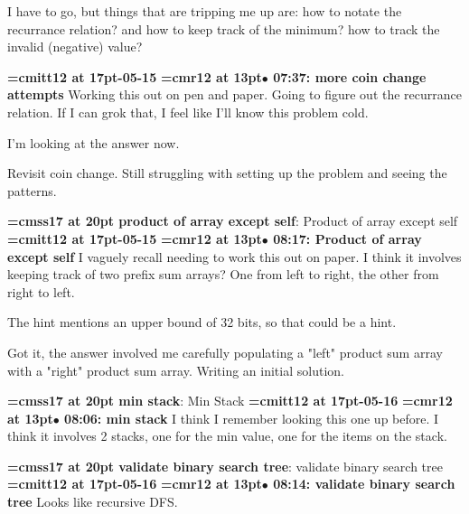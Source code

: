 I have to go, but things that are tripping me up are: how to notate the recurrance relation? and how to keep track of the minimum? how to track the invalid (negative) value?
\par

{\medskip\noindent\bf\font\titlefont=cmitt12 at 17pt-05-15}\medskip
{\smallskip\noindent\bf\font\titlefont=cmr12 at 13pt\titlefont $\bullet$ 07:37: more coin change attempts}\smallskip
Working this out on pen and paper. Going to figure out the recurrance relation. If I can grok that, I feel like I'll know this problem cold.
\par

I'm looking at the answer now.
\par

Revisit coin change. Still struggling with setting up the problem and seeing the patterns.
\par

{\medskip\noindent\bf\font\titlefont=cmss17 at 20pt product of array except self}: Product of array except self
{\medskip\noindent\bf\font\titlefont=cmitt12 at 17pt-05-15}\medskip
{\smallskip\noindent\bf\font\titlefont=cmr12 at 13pt\titlefont $\bullet$ 08:17: Product of array except self}\smallskip
I vaguely recall needing to work this out on paper. I think it involves keeping track of two prefix sum arrays? One from left to right, the other from right to left.
\par

The hint mentions an upper bound of 32 bits, so that could be a hint.
\par

Got it, the answer involved me carefully populating a "left" product sum array with a "right" product sum array. Writing an initial solution.
\par

{\medskip\noindent\bf\font\titlefont=cmss17 at 20pt min stack}: Min Stack
{\medskip\noindent\bf\font\titlefont=cmitt12 at 17pt-05-16}\medskip
{\smallskip\noindent\bf\font\titlefont=cmr12 at 13pt\titlefont $\bullet$ 08:06: min stack}\smallskip
I think I remember looking this one up before. I think it involves 2 stacks, one for the min value, one for the items on the stack.
\par

{\medskip\noindent\bf\font\titlefont=cmss17 at 20pt validate binary search tree}: validate binary search tree
{\medskip\noindent\bf\font\titlefont=cmitt12 at 17pt-05-16}\medskip
{\smallskip\noindent\bf\font\titlefont=cmr12 at 13pt\titlefont $\bullet$ 08:14: validate binary search tree}\smallskip
Looks like recursive DFS.
\par

